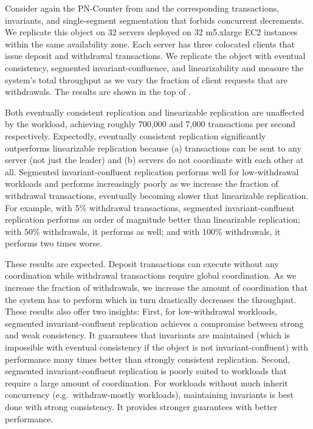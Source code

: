 \begin{benchmark}
Consider again the PN-Counter from  and the
corresponding transactions, invariants, and single-segment segmentation that
forbids concurrent decrements. We replicate this object on 32 servers
deployed on 32 m5.xlarge EC2 instances within the same availability zone.  Each
server has three colocated clients that issue deposit and withdrawal
transactions. We replicate the object with eventual consistency, segmented
invariant-confluence, and linearizability and measure the system's total
throughput as we vary the fraction of client requests that are withdrawals. The
results are shown in the top of .

Both eventually consistent replication and linearizable replication are
unaffected by the workload, achieving roughly 700,000 and 7,000 transactions
per second respectively. Expectedly, eventually consistent replication
significantly outperforms linearizable replication because (a) transactions can
be sent to any server (not just the leader) and (b) servers do not coordinate
with each other at all.
%
Segmented invariant-confluent replication performs well for low-withdrawal
workloads and performs increasingly poorly as we increase the fraction of
withdrawal transactions, eventually becoming slower that linearizable
replication. For example, with 5\% withdrawal transactions, segmented
invariant-confluent replication performs an order of magnitude better than
linearizable replication; with 50\% withdrawals, it performs as well; and with
100\% withdrawals, it performs two times worse.

These results are expected. Deposit transactions can execute without any
coordination while withdrawal transactions require global coordination. As we
increase the fraction of withdrawals, we increase the amount of coordination
that the system has to perform which in turn drastically decreases the
throughput. These results also offer two insights:
%
First, for low-withdrawal workloads, segmented invariant-confluent replication
achieves a compromise between strong and weak consistency. It guarantees that
invariants are maintained (which is impossible with eventual consistency if the
object is not invariant-confluent) with performance many times better than
strongly consistent replication.
%
Second, segmented invariant-confluent replication is poorly suited to workloads
that require a large amount of coordination. For workloads without much inherit
concurrency (e.g.\ withdraw-mostly workloads), maintaining invariants is best
done with strong consistency. It provides stronger guarantees with better
performance.
\end{benchmark}

